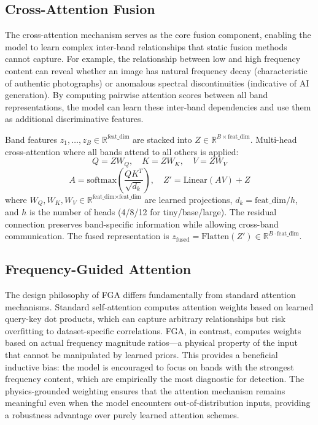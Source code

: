 \documentclass[journal]{IEEEtran}
\begin{document}
\subsection{Cross-Attention Fusion}
The cross-attention mechanism serves as the core fusion component, enabling the model to learn complex inter-band relationships that static fusion methods cannot capture. For example, the relationship between low and high frequency content can reveal whether an image has natural frequency decay (characteristic of authentic photographs) or anomalous spectral discontinuities (indicative of AI generation). By computing pairwise attention scores between all band representations, the model can learn these inter-band dependencies and use them as additional discriminative features.

Band features $z_1, \ldots, z_B \in \mathbb{R}^{\text{feat\_dim}}$ are stacked into $Z \in \mathbb{R}^{B \times \text{feat\_dim}}$. Multi-head cross-attention where all bands attend to all others is applied:
\begin{equation}
Q = ZW_Q,\quad K = ZW_K,\quad V = ZW_V
\label{eq:qkv}
\end{equation}
\begin{equation}
A = \text{softmax}\left(\frac{QK^T}{\sqrt{d_k}}\right),\quad Z' = \text{Linear}(AV) + Z
\label{eq:attention}
\end{equation}
where $W_Q, W_K, W_V \in \mathbb{R}^{\text{feat\_dim} \times \text{feat\_dim}}$ are learned projections, $d_k = \text{feat\_dim} / h$, and $h$ is the number of heads (4/8/12 for tiny/base/large). The residual connection preserves band-specific information while allowing cross-band communication. The fused representation is $z_{\text{fused}} = \text{Flatten}(Z') \in \mathbb{R}^{B \cdot \text{feat\_dim}}$.

\subsection{Frequency-Guided Attention}
The design philosophy of FGA differs fundamentally from standard attention mechanisms. Standard self-attention computes attention weights based on learned query-key dot products, which can capture arbitrary relationships but risk overfitting to dataset-specific correlations. FGA, in contrast, computes weights based on actual frequency magnitude ratios---a physical property of the input that cannot be manipulated by learned priors. This provides a beneficial inductive bias: the model is encouraged to focus on bands with the strongest frequency content, which are empirically the most diagnostic for detection. The physics-grounded weighting ensures that the attention mechanism remains meaningful even when the model encounters out-of-distribution inputs, providing a robustness advantage over purely learned attention schemes.
\end{document}
